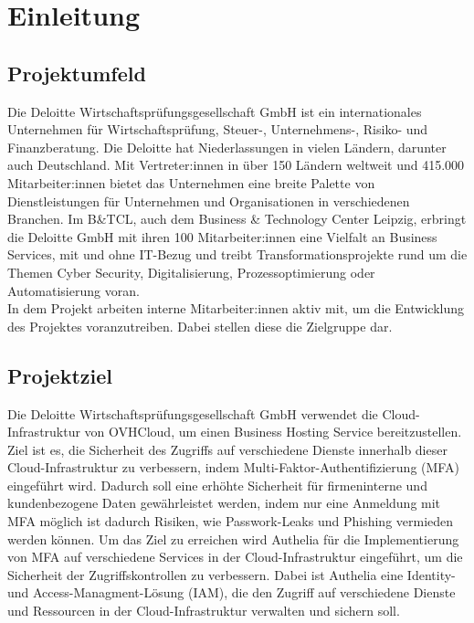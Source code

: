 \section{Einleitung}
\label{sec:Einleitung}


\subsection{Projektumfeld} 
\label{sec:Projektumfeld}
Die Deloitte Wirtschaftsprüfungsgesellschaft GmbH ist ein internationales 
Unternehmen für Wirtschaftsprüfung, Steuer-, Unternehmens-, Risiko- und Finanzberatung.
Die Deloitte hat Niederlassungen in vielen Ländern, darunter auch Deutschland. 
Mit Vertreter:innen in über 150 Ländern weltweit und 415.000 Mitarbeiter:innen bietet das Unternehmen eine breite Palette von Dienstleistungen für Unternehmen und Organisationen in verschiedenen Branchen.
Im B\&TCL, auch dem Business \& Technology Center Leipzig, erbringt die Deloitte
GmbH mit ihren 100 Mitarbeiter:innen eine Vielfalt an Business Services, mit und ohne IT-Bezug und treibt
Transformationsprojekte rund um die Themen Cyber Security, Digitalisierung,
Prozessoptimierung oder Automatisierung voran.
\\In dem Projekt arbeiten interne Mitarbeiter:innen aktiv mit, um die Entwicklung des
Projektes voranzutreiben. Dabei stellen diese die Zielgruppe dar.


\subsection{Projektziel} 
\label{sec:Projektziel}
Die Deloitte Wirtschaftsprüfungsgesellschaft GmbH verwendet die Cloud-Infrastruktur
von OVHCloud, um einen Business Hosting Service bereitzustellen. 
\\Ziel ist es, die Sicherheit des Zugriffs auf verschiedene Dienste 
innerhalb dieser Cloud-Infrastruktur zu verbessern, indem 
Multi-Faktor-Authentifizierung (MFA) eingeführt wird. 
Dadurch soll eine erhöhte Sicherheit für firmeninterne und kundenbezogene 
Daten gewährleistet werden, indem nur eine Anmeldung mit MFA möglich ist dadurch Risiken, 
wie Passwork-Leaks und Phishing vermieden werden können.
Um das Ziel zu erreichen wird Authelia für die Implementierung von MFA auf verschiedene Services 
in der Cloud-Infrastruktur eingeführt, um die Sicherheit der Zugriffskontrollen zu verbessern. 
Dabei ist Authelia eine Identity- und Access-Managment-Lösung (IAM), die den Zugriff auf 
verschiedene Dienste und Ressourcen in der Cloud-Infrastruktur verwalten und sichern soll. 


